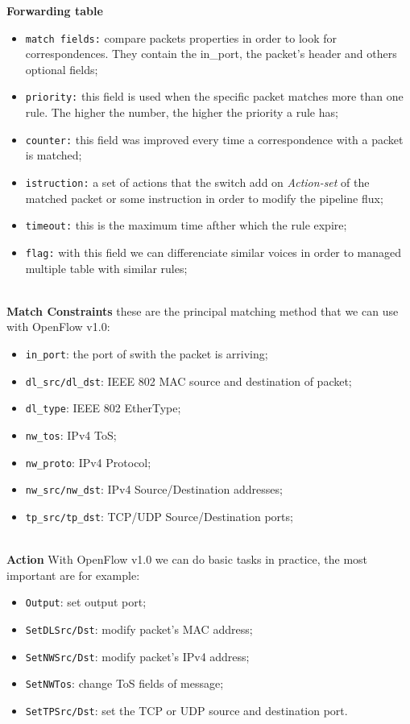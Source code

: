 \documentclass[article,10pt]{IEEEtran}
\begin{document}
\textbf{Forwarding table}
\begin{itemize}
 \item \texttt{match fields:} compare packets properties in order to look for correspondences. They contain the in_port, the packet's header and others optional fields;
 \item \texttt{priority:} this field is used when the specific packet matches more than one rule. The higher the number, the higher the priority a rule has;
 \item \texttt{counter:} this field was improved every time a correspondence with a packet is matched;
 \item \texttt{istruction:} a set of actions that the switch add on \emph{Action-set} of the matched packet or some instruction 
 in order to modify the pipeline flux;
 \item \texttt{timeout:} this is the maximum time afther which the rule expire;
 \item \texttt{flag:} with this field we can differenciate similar voices in order to managed multiple table with similar rules;
 \\
 \\
\end{itemize}

\textbf{Match Constraints}
these are the principal matching method that we can use with OpenFlow v1.0:
\begin{itemize}
 \item \texttt{in_port}: the port of swith the packet is arriving;
 \item \texttt{dl_src/dl_dst}: IEEE 802 MAC source and destination of packet;
 \item \texttt{dl_type}: IEEE 802 EtherType;
 \item \texttt{nw_tos}: IPv4 ToS;
 \item \texttt{nw_proto}: IPv4 Protocol;
 \item \texttt{nw_src/nw_dst}: IPv4 Source/Destination addresses;
 \item \texttt{tp_src/tp_dst}: TCP/UDP Source/Destination ports;
 \\
 \\
\end{itemize}

\textbf{Action} With OpenFlow v1.0 we can do basic tasks in practice, the most important are for example:
\begin{itemize}
 \item \texttt{Output}: set output port;
 \item \texttt{SetDLSrc/Dst}: modify packet's MAC address;
 \item \texttt{SetNWSrc/Dst}: modify packet's IPv4 address;
 \item \texttt{SetNWTos}: change ToS fields of message;
 \item \texttt{SetTPSrc/Dst}: set the TCP or UDP source and destination port.
\end{itemize}
\end{document}
